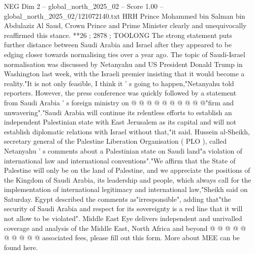 \begin{textsample}{NEG Dim 2 – global\_north\_2025\_02 – Score 1.00 – global\_north\_2025\_02/121072140.txt}
HRH Prince Mohammed bin Salman bin Abdulaziz Al Saud, Crown Prince and Prime Minister clearly and unequivocally reaffirmed this stance. **26 ; 2878 ; TOOLONG The strong statement puts further distance between Saudi Arabia and Israel after they appeared to be edging closer towards normalising ties over a year ago.
The topic of Saudi-Israel normalisation was discussed by Netanyahu and US President Donald Trump in Washington last week, with the Israeli premier insisting that it would become a reality."It is not only feasible, I think it ' s going to happen,"Netanyahu told reporters.
However, the press conference was quickly followed by a statement from Saudi Arabia ' s foreign ministry on @ @ @ @ @ @ @ @ @ @"firm and unwavering"."Saudi Arabia will continue its relentless efforts to establish an independent Palestinian state with East Jerusalem as its capital and will not establish diplomatic relations with Israel without that,"it said.
Hussein al-Sheikh, secretary general of the Palestine Liberation Organisation ( PLO ), called Netanyahu ' s comments about a Palestinian state on Saudi land"a violation of international law and international conventions"."We affirm that the State of Palestine will only be on the land of Palestine, and we appreciate the positions of the Kingdom of Saudi Arabia, its leadership and people, which always call for the implementation of international legitimacy and international law,"Sheikh said on Saturday.
Egypt described the comments as"irresponsible", adding that"the security of Saudi Arabia and respect for its sovereignty is a red line that it will not allow to be violated".
Middle East Eye delivers independent and unrivalled coverage and analysis of the Middle East, North Africa and beyond @ @ @ @ @ @ @ @ @ @ associated fees, please fill out this form.
More about MEE can be found here.

\end{textsample}
